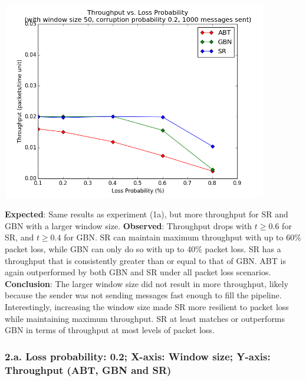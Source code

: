 \documentclass{article}
\begin{document}
\begin{center}
    \includegraphics[width=330pt,height=245pt]{images/exp1g2.png}
\end{center}

\textbf{Expected}: Same results as experiment (1a), but more throughput for SR and GBN with a larger window size.
\newline\newline
\textbf{Observed}: Throughput drops with $t\ge0.6$ for SR, and $t\ge0.4$ for GBN. SR can maintain maximum throughput with up to 60\% packet loss, while GBN can only do so with up to 40\% packet loss. SR has a throughput that is consistently greater than or equal to that of GBN. ABT is again outperformed by both GBN and SR under all packet loss scenarios.
\newline\newline
\textbf{Conclusion}: The larger window size did not result in more throughput, likely because the sender was not sending messages fast enough to fill the pipeline. Interestingly, increasing the window size made SR more resilient to packet loss while maintaining maximum throughput. SR at least matches or outperforms GBN in terms of throughput at most levels of packet loss.

\pagebreak

\subsubsection{2.a. Loss probability: 0.2; X-axis: Window size; Y-axis: Throughput (ABT, GBN and SR)}
\end{document}
